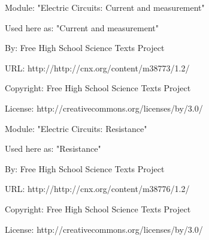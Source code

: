       \par\vspace{9pt}\noindent\begin{minipage}{\textwidth}
      Module: "Electric Circuits: Current and measurement" \par\nopagebreak\noindent
      Used here as: "Current and measurement" \par\nopagebreak\noindent
        By: Free High School Science Texts Project\par\nopagebreak\noindent
      URL: http://http://cnx.org/content/m38773/1.2/\par\nopagebreak\noindent
      \par\nopagebreak\noindent
      Copyright: Free High School Science Texts Project\par\nopagebreak\noindent
      License:  http://creativecommons.org/licenses/by/3.0/\par\nopagebreak\noindent
      \par\end{minipage}
      \par\vspace{9pt}\noindent\begin{minipage}{\textwidth}
      Module: "Electric Circuits: Resistance" \par\nopagebreak\noindent
      Used here as: "Resistance" \par\nopagebreak\noindent
        By: Free High School Science Texts Project\par\nopagebreak\noindent
      URL: http://http://cnx.org/content/m38776/1.2/\par\nopagebreak\noindent
      \par\nopagebreak\noindent
      Copyright: Free High School Science Texts Project\par\nopagebreak\noindent
      License:  http://creativecommons.org/licenses/by/3.0/\par\nopagebreak\noindent
      \par\end{minipage}
